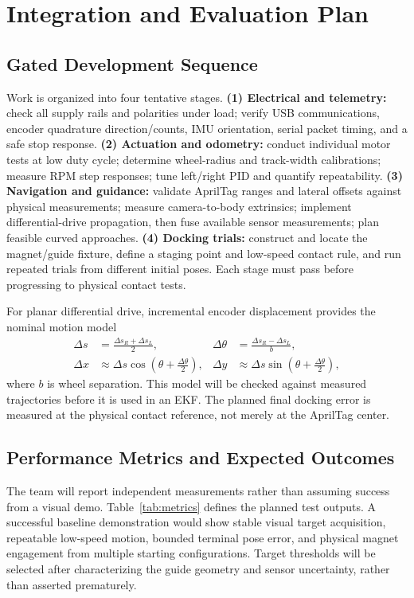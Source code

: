 \documentclass[conference,letterpaper,10pt]{IEEEtran}
\begin{document}
\section{Integration and Evaluation Plan}
\subsection{Gated Development Sequence}
Work is organized into four tentative stages. \textbf{(1) Electrical and telemetry:} check all supply rails and polarities under load; verify USB communications, encoder quadrature direction/counts, IMU orientation, serial packet timing, and a safe stop response. \textbf{(2) Actuation and odometry:} conduct individual motor tests at low duty cycle; determine wheel-radius and track-width calibrations; measure RPM step responses; tune left/right PID and quantify repeatability. \textbf{(3) Navigation and guidance:} validate AprilTag ranges and lateral offsets against physical measurements; measure camera-to-body extrinsics; implement differential-drive propagation, then fuse available sensor measurements; plan feasible curved approaches. \textbf{(4) Docking trials:} construct and locate the magnet/guide fixture, define a staging point and low-speed contact rule, and run repeated trials from different initial poses. Each stage must pass before progressing to physical contact tests.

For planar differential drive, incremental encoder displacement provides the nominal motion model
\begin{align}
\Delta s&=\frac{\Delta s_R+\Delta s_L}{2}, &
\Delta\theta&=\frac{\Delta s_R-\Delta s_L}{b},\nonumber\\[-2pt]
\Delta x&\approx\Delta s\cos\!\left(\theta+\frac{\Delta\theta}{2}\right), &
\Delta y&\approx\Delta s\sin\!\left(\theta+\frac{\Delta\theta}{2}\right),
\label{eq:odom}
\end{align}
where $b$ is wheel separation. This model will be checked against measured trajectories before it is used in an EKF. The planned final docking error is measured at the physical contact reference, not merely at the AprilTag center.

\subsection{Performance Metrics and Expected Outcomes}
The team will report independent measurements rather than assuming success from a visual demo. Table~\ref{tab:metrics} defines the planned test outputs. A successful baseline demonstration would show stable visual target acquisition, repeatable low-speed motion, bounded terminal pose error, and physical magnet engagement from multiple starting configurations. Target thresholds will be selected after characterizing the guide geometry and sensor uncertainty, rather than asserted prematurely.
\end{document}
